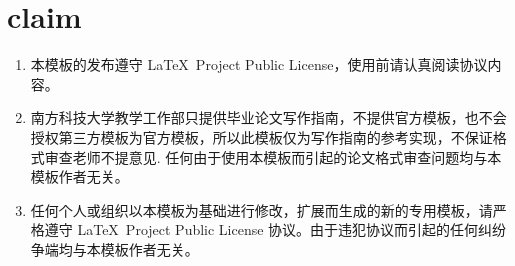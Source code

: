 \section{claim}
\begin{enumerate}[label={\alph*)}]
    \item 本模板的发布遵守 \LaTeX\ Project Public License，使用前请认真阅读协议内容。
    \item 南方科技大学教学工作部只提供毕业论文写作指南，不提供官方模板，也不会授权第三方模板为官方模板，所以此模板仅为写作指南的参考实现，不保证格式审查老师不提意见. 任何由于使用本模板而引起的论文格式审查问题均与本模板作者无关。
    \item 任何个人或组织以本模板为基础进行修改，扩展而生成的新的专用模板，请严格遵守 \LaTeX\ Project Public License 协议。由于违犯协议而引起的任何纠纷争端均与本模板作者无关。
\end{enumerate}
